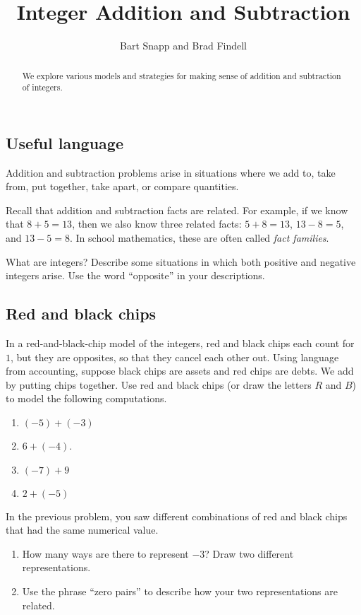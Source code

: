 \documentclass[nooutcomes]{ximera}
\title{Integer Addition and Subtraction}
\author{Bart Snapp and Brad Findell}
\begin{document}
\begin{abstract}
We explore various models and strategies for making
sense of addition and subtraction of integers.
\end{abstract}
\maketitle

\label{A:integerAddition}


\subsection*{Useful language}
Addition and subtraction problems arise in situations where we add to, take from, put together, 
take apart, or compare quantities.  

Recall that addition and subtraction facts are related.  For example, if we know that $8+5 = 13$, 
then we also know three related facts:  $5+8=13$, $13-8=5$, and $13-5=8$.  In school mathematics, 
these are often called \emph{fact families}.  

\begin{problem}
What are integers?  Describe some situations in which both positive and negative integers arise.  Use the word ``opposite'' in your descriptions.  
\end{problem}

\subsection*{Red and black chips}
\begin{problem}
In a red-and-black-chip model of the integers, red and black chips each count for $1$, but they are opposites, so that they cancel each other out.  Using language from accounting, suppose black chips are assets and red chips are debts.  We add by putting chips together.  Use red and black chips (or draw the letters $R$ and $B$) to model the following computations.
\begin{enumerate}
\item $(-5)+(-3)$
\item $6+(-4)$.
\item $(-7)+9$
\item $2+(-5)$
\end{enumerate}
\end{problem}

\begin{problem}
In the previous problem, you saw different combinations of red and black chips that had the same numerical value.  
\begin{enumerate}
\item How many ways are there to represent $-3$?  Draw two different representations. 
\item Use the phrase ``zero pairs'' to describe how your two representations are related.  
\end{enumerate}
\end{problem}
\end{document}
